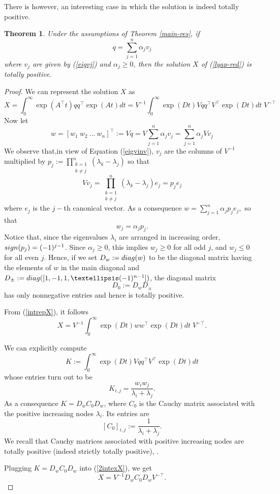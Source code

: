 \documentclass[10pt,a4paper]{amsart}
\newcommand{\tp}{^{\top}}
\newcommand{\beq}{\begin{equation}}
\newcommand{\eeq}{\end{equation}}
\newtheorem{theorem}{Theorem}
\begin{document}
There is however, an interesting case in which the solution is indeed totally positive.


\begin{theorem}
Under the assumptions of Theorem \ref{main-res}, if 
$$
q=\sum_{j=1}^n \alpha_j v_j$$
where $v_j$ are given by (\ref{eigvj}) and $\alpha_j\geq 0$, 
then the solution $X$ of (\ref{lyap-red}) is totally positive.
\end{theorem}

\begin{proof}
We can represent the solution $X$ 
as
\beq\label{intrepX}
X=\int_{0}^{\infty}\exp(A\tp t)qq\tp\exp(A t)dt=
V^{-1} \int_{0}^{\infty}\exp(D t)Vqq\tp V\tp \exp(D t)dt\;V^{-\top}
\eeq
Now let 
$$w=[w_1\ w_2\ \dots\ w_n]\tp:=Vq=V \sum_{j=1}^n \alpha_j v_j=
\sum_{j=1}^n \alpha_j V  v_j$$
We observe that,in view of Equation (\ref{eigvinv}), $v_j$ are the columns of $V^{-1}$ multiplied by
$p_j:={\prod_{\substack{k=1 \\ k \neq j}}^n (\lambda_k - \lambda_j)}$
so that
$$
V  v_j={\prod_{\substack{k=1 \\ k \neq j}}^n (\lambda_k - \lambda_j)} e_j=p_je_j$$
where $e_j$ is the $j-$th canonical vector.
As a consequence
$
w=\sum_{j=1}^n \alpha_jp_je_j,$ so that
$$w_j= \alpha_j p_j.$$
Notice that, since the eigenvalues $\lambda_i$ are arranged in increasing order, ${\rm sign}(p_j)=(-1)^{j-1}$. Since $\alpha_j\geq 0$, this implies
$w_j\geq 0$ for all odd $j$, and $w_j\leq 0$ for all even $j$.
Hence, if we set $D_w:={\rm{diag}}(w)$ to be the diagonal matrix having the elements of $w$ in the main diagonal and $D_{\pm}:={\rm{diag}}([1,-1,1,\dots (-1)^{n-1}])$, the diagonal matrix 
$$D_0:=D_w D_{\pm}$$ 
has only nonnegative entries and hence is totally positive.
 

From (\ref{intrepX}), it follows
\beq\label{2intexX}
X=
V^{-1} \int_{0}^{\infty}\exp(D t)w w\tp \exp(D t)dt\;V^{-\top}.
\eeq

We can explicitly compute 
$$K:=\int_{0}^{\infty}\exp(D t)Vqq\tp V\tp \exp(D t)dt$$
whose entries turn out to be
$$
K_{i,j}=\frac{w_iw_j}{\lambda_i+\lambda_j}.$$
As a consequence $K=D_w C_0 D_w$, where $C_0$ is the Cauchy matrix associated with the positive increasing nodes $\lambda_i$. Its entries are
$$
[C_0]_{i,j}:=\frac{1}{\lambda_i+\lambda_j}.$$
We recall that Cauchy matrices associated with positive increasing nodes
are totally positive (indeed strictly totally positive), \cite[page 92]{Pinkus-TPM}.

Plugging $K=D_w C_0 D_w$ into (\ref{2intexX}), we get
$$
X=V^{-1}D_w C_0 D_wV^{-\top}.
$$


\end{proof}
\end{document}
